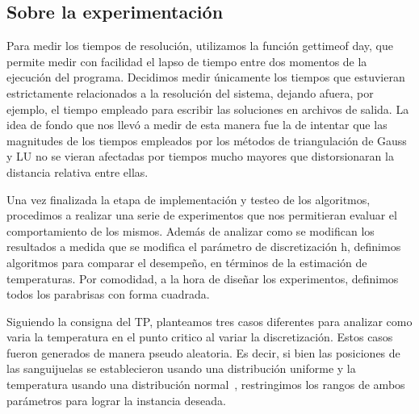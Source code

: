 \noindent{} 

\subsection{Sobre la experimentación}

Para medir los tiempos de resolución, utilizamos la función gettimeof day, que permite medir con
facilidad el lapso de tiempo entre dos momentos de la ejecución del programa. Decidimos medir
únicamente los tiempos que estuvieran estrictamente relacionados a la resolución del sistema,
dejando afuera, por ejemplo, el tiempo empleado para escribir las soluciones en archivos de salida. La
idea de fondo que nos llevó a medir de esta manera fue la de intentar que las magnitudes de los tiempos
empleados por los métodos de triangulación de Gauss y LU no se vieran afectadas por tiempos mucho
mayores que distorsionaran la distancia relativa entre ellas.

Una vez finalizada la etapa de implementación y testeo de los algoritmos, procedimos a realizar una
serie de experimentos que nos permitieran evaluar el comportamiento de los mismos. Además de
analizar como se modifican los resultados a medida que se modifica el parámetro de discretización
h, definimos algoritmos para comparar el desempeño, en términos de la estimación de temperaturas.
Por comodidad, a la hora de diseñar los experimentos, definimos todos los parabrisas con forma cuadrada.

Siguiendo la consigna del TP, planteamos tres casos diferentes para analizar como varia la temperatura 
en el punto critico al variar la discretización. Estos casos fueron generados de manera pseudo aleatoria. Es decir, si bien las posiciones de las sanguijuelas se establecieron usando una distribución uniforme y la temperatura usando una distribución normal~\cite{proba}, restringimos los rangos de ambos parámetros para lograr la instancia deseada.


